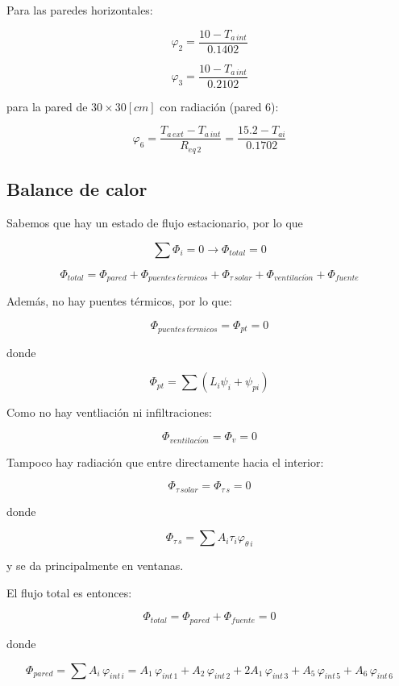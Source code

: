 \documentclass[11pt]{article}
\begin{document}
Para las paredes horizontales:

\[ \varphi _2 = \frac{ 10 - T_{ a \, int } }{ 0.1402 } \]

\[ \varphi _3 = \frac{ 10 - T_{ a \, int } }{ 0.2102 } \]

para la pared de $ 30 \times 30 \left[ cm \right] $ con radiación (pared 6):

\[ \varphi _6 = \frac{ T_{ a \, ext } - T_{ a \, int } }{ R_{ eq \, 2 } } = \frac{ 15.2 - T_{ ai } }{ 0.1702 } \]

\subsection{Balance de calor}

Sabemos que hay un estado de flujo estacionario, por lo que

\[  \sum{ \Phi _i } = 0 \longrightarrow \Phi _{ total } = 0 \]

\[ \Phi _{ total } = \Phi _{ pared } + \Phi _{ puentes \, t \acute{e} rmicos } + \Phi _{ \tau \, solar } + \Phi _{ ventilaci \acute{o} n } + \Phi _{ fuente } \]

Además, no hay puentes térmicos, por lo que:

\[ \Phi _{ puentes \, t \acute{e}rmicos } = \Phi _{ pt } = 0 \]

donde

\[ \Phi _{ pt } = \sum{ \left( L_i \psi _i + \psi _{ pi } \right) }  \]

Como no hay ventliación ni infiltraciones:

\[ \Phi _{ ventilaci \acute{o} n } = \Phi _v = 0 \]

Tampoco hay radiación que entre directamente hacia el interior:

\[ \Phi _{ \tau \, solar } = \Phi _{ \tau \, s } = 0 \]

donde

\[ \Phi _{ \tau \, s } = \sum{ A_i \tau _i \varphi _{ \theta \, i } } \]

y se da principalmente en ventanas.

El flujo total es entonces:

\[ \Phi _{ total } = \Phi _{ pared } + \Phi _{ fuente } = 0 \]

donde

\[ \Phi _{ pared } = \sum{ A_i \, \varphi _{ int \, i } } = A_1 \, \varphi _{ int \, 1 } + A_2 \, \varphi _{ int \, 2 } + 2 A_1 \, \varphi _{ int \, 3 } + A_5 \, \varphi _{ int \, 5 } + A_6 \, \varphi _{ int \, 6 } \]
\end{document}
